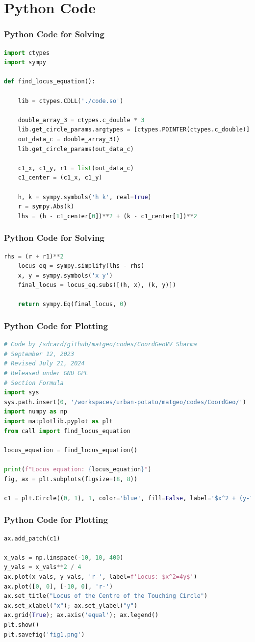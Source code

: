 \documentclass{beamer}
\theoremstyle{remark}
\numberwithin{equation}{section}
\begin{document}
\section{Python Code}
\begin{frame}[fragile]
\frametitle{Python Code for Solving}
\begin{lstlisting}[language=Python]
import ctypes
import sympy

def find_locus_equation():
     
    lib = ctypes.CDLL('./code.so')
   
    double_array_3 = ctypes.c_double * 3
    lib.get_circle_params.argtypes = [ctypes.POINTER(ctypes.c_double)]
    out_data_c = double_array_3()
    lib.get_circle_params(out_data_c)
     
    c1_x, c1_y, r1 = list(out_data_c)
    c1_center = (c1_x, c1_y)
 
    h, k = sympy.symbols('h k', real=True)
    r = sympy.Abs(k)
    lhs = (h - c1_center[0])**2 + (k - c1_center[1])**2

\end{lstlisting}
\end{frame}
\begin{frame}[fragile]
\frametitle{Python Code for Solving}
\begin{lstlisting}[language=Python]
   rhs = (r + r1)**2
    locus_eq = sympy.simplify(lhs - rhs)
    x, y = sympy.symbols('x y')
    final_locus = locus_eq.subs([(h, x), (k, y)])
    
    return sympy.Eq(final_locus, 0)
\end{lstlisting}
\end{frame}
\begin{frame}[fragile]
\frametitle{Python Code for Plotting}
\begin{lstlisting}[language=Python]
# Code by /sdcard/github/matgeo/codes/CoordGeoVV Sharma
# September 12, 2023
# Revised July 21, 2024
# Released under GNU GPL
# Section Formula
import sys
sys.path.insert(0, '/workspaces/urban-potato/matgeo/codes/CoordGeo/') 
import numpy as np
import matplotlib.pyplot as plt
from call import find_locus_equation  

locus_equation = find_locus_equation()
 
print(f"Locus equation: {locus_equation}")
fig, ax = plt.subplots(figsize=(8, 8))
  
c1 = plt.Circle((0, 1), 1, color='blue', fill=False, label='$x^2 + (y-1)^2 = 1$')

\end{lstlisting}
\end{frame}
\begin{frame}[fragile]
\frametitle{Python Code for Plotting}
\begin{lstlisting}[language=Python]
ax.add_patch(c1)
 
x_vals = np.linspace(-10, 10, 400)
y_vals = x_vals**2 / 4
ax.plot(x_vals, y_vals, 'r-', label=f'Locus: $x^2=4y$')
ax.plot([0, 0], [-10, 0], 'r-') 
ax.set_title("Locus of the Centre of the Touching Circle")
ax.set_xlabel("x"); ax.set_ylabel("y")
ax.grid(True); ax.axis('equal'); ax.legend()
plt.show()
plt.savefig('fig1.png')
\end{lstlisting}
\end{frame}
\end{document}
